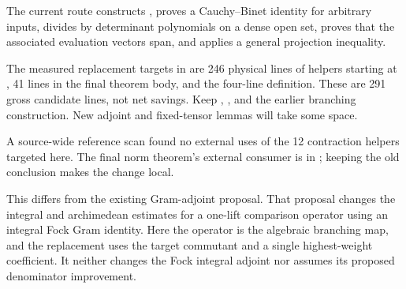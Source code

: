 The current route constructs , proves a
Cauchy--Binet identity for arbitrary inputs, divides by determinant
polynomials on a dense open set, proves that the associated evaluation
vectors span, and applies a general projection inequality.

The measured replacement targets in
 are 246 physical
lines of helpers starting at , 41 lines in the final
theorem body, and the four-line  definition.
These are 291 gross candidate lines, not net savings.
Keep , , and the
earlier branching construction. New adjoint and fixed-tensor lemmas will
take some space.

A source-wide reference scan found no external uses of the 12 contraction
helpers targeted here. The final norm theorem's external consumer is in
;
keeping the old conclusion makes the change local.

This differs from the existing Gram-adjoint proposal. That proposal changes
the integral and archimedean estimates for a one-lift comparison operator
using an integral Fock Gram identity. Here the operator is the algebraic
branching map, and the replacement uses the target commutant and a single
highest-weight coefficient. It neither changes the Fock integral adjoint
nor assumes its proposed denominator improvement.
